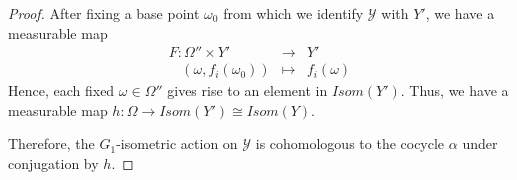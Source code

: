 \documentclass[10pt,a4paper]{amsart}
\newcommand{\YY}{\mathcal{Y}}     %
\begin{document}
\begin{proof}
After fixing a base point $\omega_0$ from which we identify $\YY$ with $Y'$, we have a measurable map 
\begin{eqnarray*}
    F:\Omega'' \times Y' &\rightarrow & Y'\\
\ \ \ \ (\omega,f_i(\omega_0)) &\mapsto & f_i(\omega)
    \end{eqnarray*}
Hence, each fixed $\omega\in\Omega''$ gives rise to an element in $Isom(Y')$. Thus, we have a measurable map $h:\Omega\rightarrow Isom(Y')\cong Isom(Y)$.\par 
Therefore, the $G_1$-isometric action on $\YY$ is cohomologous to the cocycle $\alpha$ under conjugation by $h$.
\end{proof}
\end{document}
